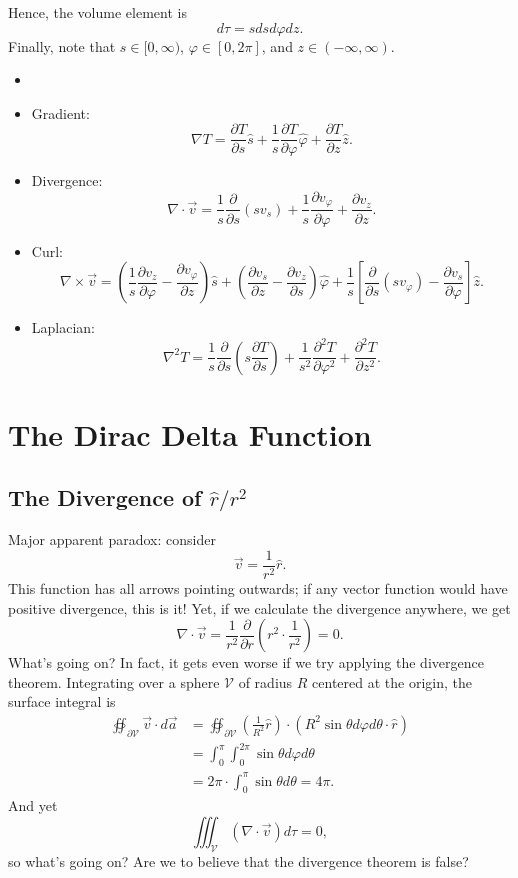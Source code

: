 Hence, the volume element is
\[d\tau=sdsd\varphi dz.\]
Finally, note that $s\in[0,\infty)$, $\varphi\in[0,2\pi]$, and $z\in(-\infty,\infty)$.

\begin{proposition}
    \begin{itemize}
        \item[]
        \item Gradient:
        \[\nabla T=\frac{\partial T}{\partial s}\hat{s}+\frac{1}{s}\frac{\partial T}{\partial\varphi}\hat{\varphi}+\frac{\partial T}{\partial z}\hat{z}.\]
        \item Divergence:
        \[\nabla\cdot\vec{v}
        =\frac{1}{s}\frac{\partial}{\partial s}(sv_s)+\frac{1}{s}\frac{\partial v_\varphi}{\partial\varphi}+\frac{\partial v_z}{\partial z}.\]
        \item Curl:
        \[\nabla\times \vec{v}=\left(\frac{1}{s}\frac{\partial v_z}{\partial\varphi}-\frac{\partial v_\varphi}{\partial z}\right)\hat{s}+\left(\frac{\partial v_s}{\partial z}-\frac{\partial v_z}{\partial s}\right)\hat{\varphi}+\frac{1}{s}\left[\frac{\partial}{\partial s}(sv_\varphi)-\frac{\partial v_s}{\partial\varphi}\right]\hat{z}.\]
        \item Laplacian:
        \[\nabla^2 T=\frac{1}{s}\frac{\partial}{\partial s}\left(s\frac{\partial T}{\partial s}\right)+\frac{1}{s^2}\frac{\partial^2T}{\partial\varphi^2}+\frac{\partial^2T}{\partial z^2}.\]
    \end{itemize}
\end{proposition}

\section{The Dirac Delta Function}

\subsection{The Divergence of $\hat{r}/r^2$}

Major apparent paradox: consider 
\[\vec{v}=\frac{1}{r^2}\hat{r}.\]
This function has all arrows pointing outwards; if any vector function would have positive divergence, this is it! Yet, if we calculate the divergence anywhere, we get
\[\nabla\cdot\vec{v}=\frac{1}{r^2}\frac{\partial}{\partial r}\left(r^2\cdot\frac{1}{r^2}\right)=0.\]
What's going on? In fact, it gets even worse if we try applying the divergence theorem. Integrating over a sphere $\mathcal{V}$ of radius $R$ centered at the origin, the surface integral is
\begin{align*}
\oiint_{\partial \mathcal{V}}\vec{v}\cdot d\vec{a}&=\oiint_{\partial\mathcal{V}}\left(\frac{1}{R^2}\hat{r}\right)\cdot (R^2\sin\theta d\varphi d\theta\cdot \hat{r})\\
&=\int_0^\pi \int_0^{2\pi} \sin\theta d\varphi d\theta\\
&=2\pi\cdot\int_0^\pi\sin\theta d\theta=4\pi.
\end{align*}
And yet
\[\iiint_{\mathcal{V}}(\nabla\cdot\vec{v}) d\tau=0,\]
so what's going on? Are we to believe that the divergence theorem is false?

